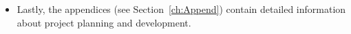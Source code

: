 \begin{itemize}
\item Lastly, the appendices (see Section~\ref{ch:Append}) contain detailed
  information about project planning and development.
\end{itemize}



